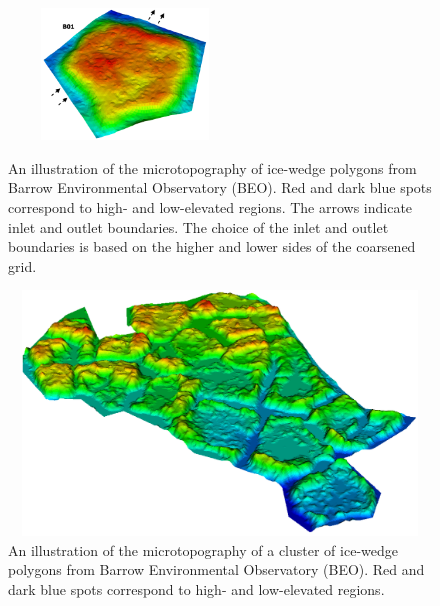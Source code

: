 \begin{figure}[!h]
\includegraphics[width=6.2cm, height=3.5cm]{./figures/polygons-finescale/3DpolygonB01-3B.png} \\
\caption{An illustration of the microtopography of ice-wedge polygons from Barrow Environmental Observatory (BEO). Red and dark blue spots correspond to high- and low-elevated regions. The arrows indicate inlet and outlet boundaries. The choice of the inlet and outlet boundaries is  based on the higher and lower sides of the coarsened grid.}
\label{IWP-finemesh}
\end{figure}

\begin{figure}[!h]
\centering
\vskip -4.5cm
\includegraphics[width=12.2cm, height=6.5cm]{./figures/polygons-finescale/lobster-finemesh-elevation.png}
\caption{An illustration of the microtopography of a cluster of ice-wedge polygons from Barrow Environmental Observatory (BEO). Red and dark blue spots correspond to high- and low-elevated regions.}
\label{lobster-finemesh}
\end{figure}

